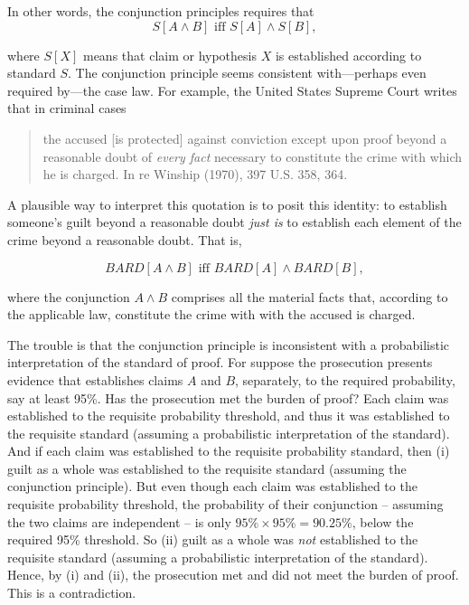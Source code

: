 \documentclass[10pt,dvipsnames,enabledeprecatedfontcommands]{scrartcl}
\newcommand{\et}{\wedge}
\begin{document}
\noindent In other words, the conjunction principles requires that
\[S[A \wedge B] \text{ iff } S[A] \wedge S[B],\]

\noindent where \(S[X]\) means that claim or hypothesis \(X\) is
established according to standard \(S\). The conjunction principle seems
consistent with---perhaps even required by---the case law. For example,
the United States Supreme Court writes that in criminal cases

\begin{quote}
the accused [is protected] against conviction except upon proof beyond a reasonable doubt of \textit{every fact} necessary to constitute the crime with which he is charged. In re Winship (1970), 397 U.S. 358, 364. 
\end{quote}

\noindent A plausible way to interpret this quotation is to posit this
identity: to establish someone's guilt beyond a reasonable doubt
\textit{just is} to establish each element of the crime beyond a
reasonable doubt. That is,

\[BARD[A \wedge B] \text{ iff } BARD[A] \wedge BARD[B],\]

\noindent where the conjunction \(A \et B\) comprises all the material
facts that, according to the applicable law, constitute the crime with
with the accused is charged.

The trouble is that the conjunction principle is inconsistent with a
probabilistic interpretation of the standard of proof. For suppose the
prosecution presents evidence that establishes claims \(A\) and \(B\),
separately, to the required probability, say at least 95\%. Has the
prosecution met the burden of proof? Each claim was established to the
requisite probability threshold, and thus it was established to the
requisite standard (assuming a probabilistic interpretation of the
standard). And if each claim was established to the requisite
probability standard, then (i) guilt as a whole was established to the
requisite standard (assuming the conjunction principle). But even though
each claim was established to the requisite probability threshold, the
probability of their conjunction -- assuming the two claims are
independent -- is only \(95\%\times95\%=90.25\%\), below the required
95\% threshold. So (ii) guilt as a whole was \textit{not} established to
the requisite standard (assuming a probabilistic interpretation of the
standard). Hence, by (i) and (ii), the prosecution met and did not meet
the burden of proof. This is a contradiction.
\end{document}

